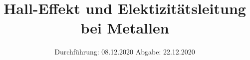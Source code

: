

\subject{V311}
\title{Hall-Effekt und Elektizitätsleitung bei Metallen}
\date{%
  Durchführung: 08.12.2020
  \hspace{3em}
  Abgabe: 22.12.2020
}



\maketitle
\thispagestyle{empty}
\tableofcontents
\newpage







\printbibliography{}
\nocite{*}

